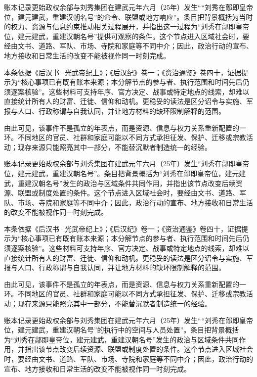 账本记录更始政权余部与刘秀集团在建武元年六月（25年）发生““刘秀在鄗即皇帝位，建元建武，重建汉朝名号”的命令、联盟或地方响应”。条目把背景概括为当时的权力、资源与信息约束推动相关过程展开，并指出这一过程为“刘秀在鄗即皇帝位，建元建武，重建汉朝名号”提供可观察的条件。这个节点进入区域社会时，要经由文书、道路、军队、市场、寺院和家庭等不同中介；因此，政治行动的宣布、地方接收和日常生活的改变不能被视作同一时刻完成。

本条依据《后汉书·光武帝纪上》；《后汉纪》卷一；《资治通鉴》卷四十，证据提示为“核心事项已有既有账本来源；本分解节点的参与者、执行范围和时间先后仍须逐案核验”。这些材料可支持年序、官方决定、战事或特定地点的线索，却难以直接统计所有人的财富、迁徙、信仰和动机。更稳妥的读法是区分诏令与实施、军报与人口、行政称谓与自我认同，并让地方材料的缺环限制解释的范围。

由此可见，该事件不是孤立的年表点，而是资源、信息与权力关系重新配置的一环。不同地区的官员、社群和家庭可能以不同方式承担征发、保护、迁移或宗教活动；现存来源只能照亮其中一部分，不能替沉默者制造统一的经验。

账本记录更始政权余部与刘秀集团在建武元年六月（25年）发生“刘秀在鄗即皇帝位，建元建武，重建汉朝名号”。条目把背景概括为“刘秀在鄗即皇帝位，建元建武，重建汉朝名号”发生的政治与区域条件共同作用，并指出该节点改变后续资源、联盟或制度处置的条件。这个节点进入区域社会时，要经由文书、道路、军队、市场、寺院和家庭等不同中介；因此，政治行动的宣布、地方接收和日常生活的改变不能被视作同一时刻完成。

本条依据《后汉书·光武帝纪上》；《后汉纪》卷一；《资治通鉴》卷四十，证据提示为“核心事项已有既有账本来源；本分解节点的参与者、执行范围和时间先后仍须逐案核验”。这些材料可支持年序、官方决定、战事或特定地点的线索，却难以直接统计所有人的财富、迁徙、信仰和动机。更稳妥的读法是区分诏令与实施、军报与人口、行政称谓与自我认同，并让地方材料的缺环限制解释的范围。

由此可见，该事件不是孤立的年表点，而是资源、信息与权力关系重新配置的一环。不同地区的官员、社群和家庭可能以不同方式承担征发、保护、迁移或宗教活动；现存来源只能照亮其中一部分，不能替沉默者制造统一的经验。

账本记录更始政权余部与刘秀集团在建武元年六月（25年）发生““刘秀在鄗即皇帝位，建元建武，重建汉朝名号”的执行中的空间与人员处置”。条目把背景概括为“刘秀在鄗即皇帝位，建元建武，重建汉朝名号”发生的政治与区域条件共同作用，并指出该节点改变后续资源、联盟或制度处置的条件。这个节点进入区域社会时，要经由文书、道路、军队、市场、寺院和家庭等不同中介；因此，政治行动的宣布、地方接收和日常生活的改变不能被视作同一时刻完成。


